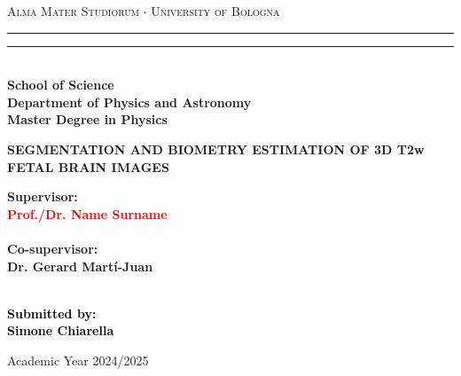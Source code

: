 \documentclass[12pt,a4paper]{report}
\begin{document}
\begin{titlepage}
%
%
%
%
\begin{center}
{{\Large{\textsc{Alma Mater Studiorum $\cdot$ University of  Bologna}}}} 
\rule[0.1cm]{15.8cm}{0.1mm}
\rule[0.5cm]{15.8cm}{0.6mm}
\\\vspace{3mm}
{\small{\bfseries School of Science \\
Department of Physics and Astronomy\\
Master Degree in Physics}}
\end{center}

\vspace{23mm}

\begin{center}
%
%
\begin{spacing}{2}
{\LARGE{\bfseries SEGMENTATION AND BIOMETRY ESTIMATION OF 3D T2w FETAL BRAIN IMAGES}}\\
\end{spacing}
\end{center}

\vspace{35mm} \par \noindent

\begin{minipage}[t]{0.47\textwidth}
%
%
{\large{\bfseries Supervisor: \vspace{2mm}\\\textcolor{red}{
Prof./Dr. Name Surname}\\\\
%
%
%
\bfseries Co-supervisor:
\vspace{2mm}\\
Dr. Gerard Martí-Juan\\\\}}
\end{minipage}
%
\hfill
%
\begin{minipage}[t]{0.47\textwidth}\raggedleft \textcolor{black}{
{\large{\bfseries Submitted by:
\vspace{2mm}\\
%
%
Simone Chiarella}}}

\end{minipage}

\vspace{20mm}

\begin{center}
%
%
Academic Year 2024/2025
\end{center}

\end{titlepage}
\end{document}
